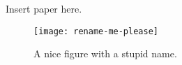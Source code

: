 \documentclass[letterpaper,twocolumn,amsmath,amssymb,pre,aps,10pt]{revtex4-1}
\begin{document}
Insert paper here.

\begin{figure}
  \texttt{[image: rename-me-please]}
  \caption{A nice figure with a stupid name.}
\end{figure}

\cite{roth2002whitebear}

\end{document}
